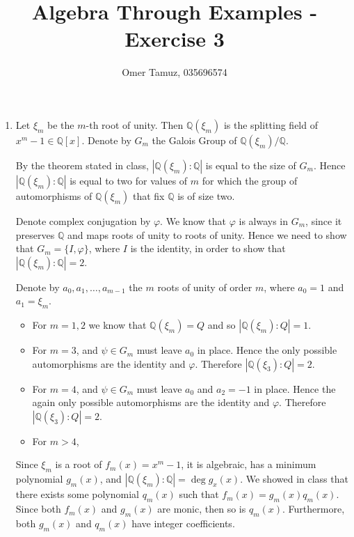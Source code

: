 \documentclass[11pt]{article} \usepackage{amssymb}
\newcommand{\Q}{\mathbb Q}
\renewcommand{\phi}{\varphi}
\begin{document}
\title{Algebra Through Examples - Exercise 3}

 \author{Omer Tamuz, 035696574}
\maketitle


\begin{enumerate}
\item 
  Let $\xi_m$ be the $m$-th root of unity. Then $\Q(\xi_m)$ is the splitting
  field of $x^m-1 \in \Q[x]$. Denote by $G_m$ the Galois
  Group of $\Q(\xi_m) / \Q$.

  By the theorem stated in class, $|\Q(\xi_m):\Q|$ is
  equal to the size of  $G_m$. Hence 
  $|\Q(\xi_m):\Q|$ is equal to two for values of $m$ for which the group of 
  automorphisms of $\Q(\xi_m)$ that fix $\Q$ is of size two. 

  Denote complex conjugation by $\phi$. We know that $\phi$ is always in $G_m$,
  since it preserves $\Q$ and maps roots of unity to roots of unity. Hence we 
  need to show that $G_m=\{I,\phi\}$, where $I$ is the identity, in order to
  show that $|\Q(\xi_m):\Q|=2$.

  Denote by $a_0,a_1,\ldots,a_{m-1}$ the $m$ roots of unity of order $m$,
  where $a_0=1$ and $a_1=\xi_m$.
  \begin{itemize}
  \item For $m=1,2$ we know that $\Q(\xi_m)=Q$ and so $|\Q(\xi_m):Q|=1$.
  \item For $m=3$, and $\psi \in G_m$ must leave $a_0$ in place. Hence the only
    possible automorphisms are the identity and $\phi$. Therefore 
     $|\Q(\xi_3):Q|=2$.
  \item For $m=4$, and $\psi \in G_m$ must leave $a_0$ and $a_2=-1$ in place. 
    Hence the again only possible automorphisms are the identity and $\phi$. 
    Therefore $|\Q(\xi_3):Q|=2$.
  \item For $m>4$, 
  \end{itemize}
  
  
  




  Since $\xi_m$ is a root of $f_m(x)=x^m-1$, it is algebraic, has
  a minimum polynomial $g_m(x)$, and $|\Q(\xi_m):\Q|=\deg g_x(x)$. 
  We showed in class that
  there exists some polynomial $q_m(x)$ such that $f_m(x)=g_m(x)q_m(x)$. Since both
  $f_m(x)$ and $g_m(x)$ are monic, then so is $q_m(x)$. Furthermore, both $g_m(x)$ and
  $q_m(x)$ have integer coefficients. 


\end{enumerate}
\end{document}
